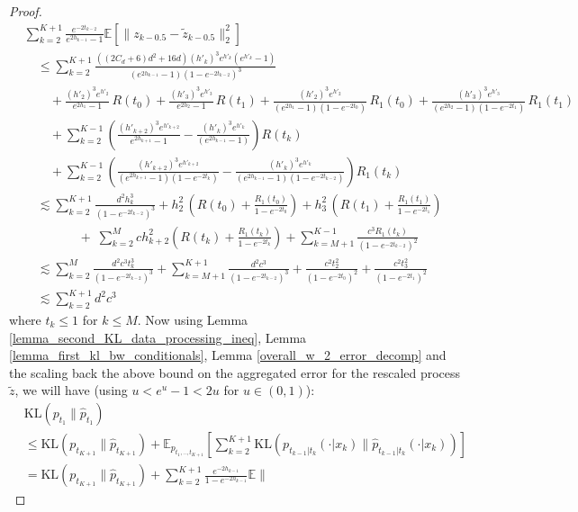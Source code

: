 \documentclass{article}
\newcommand{\E}{\mathbb{E}}
\newcommand{\KL}[2]{\mathrm{KL}\left(#1 \big\| #2\right)}
\begin{document}
\begin{proof}
\begin{align*}
&\sum^{K+1}_{k=2} \frac{e^{-2t_{k-2}}}{e^{2h_{k-1}}-1}  \mathbb{E}\left[\|z_{k-0.5}-\tilde{z}_{k-0.5}\|_2^2\right] \\
        &\quad \leq \sum_{k=2}^{K+1}\frac{\left((2C_d+6)d^2 +16d\right)(h'_k)^3e^{h'_k}(e^{h'_k}-1)}{(e^{2h_{k-1}}-1)(1-e^{-2t_{k-2}})^3}  \\
        &\qquad +\frac{(h'_2)^3e^{h'_2}}{e^{2h_1}-1}\,R(t_0)
+\frac{(h'_3)^3e^{h'_3}}{e^{2h_2}-1}\,R(t_1)+\frac{(h'_2)^3e^{h'_2}}{(e^{2h_1}-1)(1-e^{-2t_0})}\,R_1(t_0)
+\frac{(h'_3)^3e^{h'_3}}{(e^{2h_2}-1)(1-e^{-2t_1})}\,R_1(t_1)\\
& \qquad +\sum_{k=2}^{K-1}\left(\frac{(h'_{k+2})^3e^{h'_{k+2}}}{e^{2h_{k+1}}-1}-\frac{(h'_k)^3e^{h'_k}}{(e^{2h_{k-1}}-1)}\right)\!R(t_k) \\
& \qquad +\sum_{k=2}^{K-1}\left(\frac{(h'_{k+2})^3e^{h'_{k+2}}}{(e^{2h_{k+1}}-1)(1-e^{-2t_k})}-\frac{(h'_k)^3e^{h'_k}}{(e^{2h_{k-1}}-1)(1-e^{-2t_{k-2}})}\right)\!R_1(t_k) \\
 &\quad \lesssim  \sum_{k=2}^{K+1}\frac{d^2h_k^3}{(1-e^{-2t_{k-2}})^3} +{h^2_2}\,\left(R(t_0) +\frac{R_1(t_0)}{1-e^{-2t_0}}  \right)+ {h^2_3}\,\left(R(t_1) +\frac{R_1(t_1)}{1-e^{-2t_1}}  \right) \\
& \qquad \qquad \;+\;\sum_{k=2}^{M}{ch_{k+2}^2}\left(R(t_k) +\frac{R_1(t_k)}{1-e^{-2t_k}} \right) + \sum_{k=M+1}^{K-1}\frac{c^3R_1(t_k)}{(1-e^{-2t_{k-2}})^2}\\
 & \quad \overset{}{\lesssim} \sum_{k=2}^M \frac{d^2c^3t_k^3}{(1-e^{-2t_{k-2}})^3} + \sum_{k=M+1}^{K+1}\frac{d^2c^3}{(1-e^{-2t_{k-2}})^3} + \frac{c^2t_2^2}{(1-e^{-2t_0})^2} + \frac{c^2t_3^2}{(1-e^{-2t_1})^2} \\
 &\quad \lesssim \sum^{K+1}_{k=2}d^2c^3
    \end{align*}
    where $t_k\leq 1$ for $k\leq M$. Now using Lemma \ref{lemma_second_KL_data_processing_ineq}, Lemma \ref{lemma_first_kl_bw_conditionals}, Lemma \ref{overall_w_2_error_decomp} and the scaling back the above bound on the aggregated error for the rescaled process $\tilde{z}$, we will have (using $u<e^{u}-1<2u$ for $u\in (0,1)$):
    \begin{align*}
        &\KL{p_{t_1}}{\hat{p}_{t_1}}\\
        &\leq  \KL{{p}_{t_{K+1}}}{\hat{p}_{t_{K+1}}} + 
   \E_{{p}_{t_1,..,t_{K+1}}} \left[ \sum_{k=2}^{K+1}
       \KL{{p}_{t_{k-1}|t_k}(\cdot|{x}_{k})}{\hat{p}_{t_{k-1}|t_k}(\cdot|{x}_k)}\right] \\
       &= \KL{{p}_{t_{K+1}}}{\hat{p}_{t_{K+1}}} + \sum_{k=2}^{K+1} {\frac{e^{-2h_{k-1}}}{1-e^{-2h_{k-1}}}} \mathbb{E}\|

\end{align*}
\end{proof}
\end{document}
